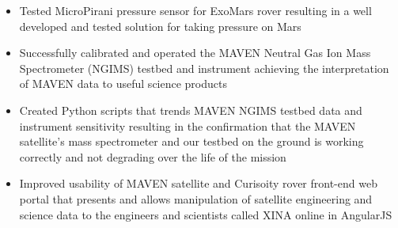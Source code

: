 \documentclass{res}
\begin{document}
\begin{resume}
\begin{itemize}
		\item Tested MicroPirani pressure sensor for ExoMars rover resulting in a well developed and tested solution for taking pressure on Mars
		\item Successfully calibrated and operated the MAVEN Neutral Gas Ion Mass Spectrometer (NGIMS) testbed and instrument  achieving the interpretation of MAVEN data to useful science products
		\item Created Python scripts that trends MAVEN NGIMS testbed data and instrument sensitivity resulting in the confirmation that the MAVEN satellite's mass spectrometer and our testbed on the ground is working correctly and not degrading over the life of the mission
		\item Improved usability of MAVEN satellite and Curisoity rover front-end web portal that presents and allows manipulation of satellite engineering and science data to the engineers and scientists called XINA online in AngularJS
                \end{itemize}


\end{resume}
\end{document}
